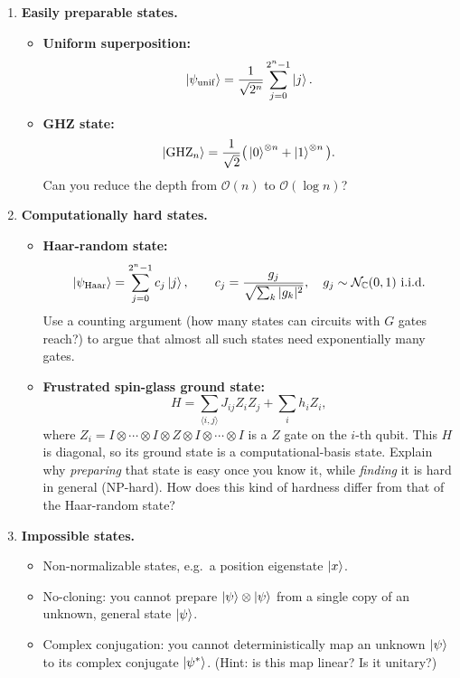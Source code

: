 \documentclass[11pt]{article}
\begin{document}
\begin{enumerate}[label=(\alph*)]
\item \textbf{Easily preparable states.}
\begin{itemize}
  \item \textbf{Uniform superposition:}
  \[
  \ket{\psi_{\mathrm{unif}}}=\frac{1}{\sqrt{2^n}}\sum_{j=0}^{2^n-1}\ket{j}.
  \]

  \item \textbf{GHZ state:}
  \[
  \ket{\mathrm{GHZ}_n}=\frac{1}{\sqrt{2}}\big(\ket{0}^{\otimes n}+\ket{1}^{\otimes n}\big).
  \]
  Can you reduce the depth from $\mathcal{O}(n)$ to $\mathcal{O}(\log n)$?
\end{itemize}

\item \textbf{Computationally hard states.}
\begin{itemize}
  \item \textbf{Haar-random state:}
  \[
  \ket{\psi_{\mathrm{Haar}}}=\sum_{j=0}^{2^n-1}c_j\ket{j}, \qquad c_j=\frac{g_j}{\sqrt{\sum_k |g_k|^2}},\quad g_j\sim\mathcal{N}_{\mathbb{C}}(0,1)\ \text{i.i.d.}
  \]
  Use a counting argument (how many states can circuits with $G$ gates reach?) to argue that almost all such states need exponentially many gates.

  \item \textbf{Frustrated spin-glass ground state:}
  \[
  H=\sum_{\langle i,j\rangle}J_{ij}Z_iZ_j+\sum_i h_iZ_i,
  \]
  where $Z_i = I \otimes \cdots \otimes I \otimes Z \otimes I \otimes \cdots \otimes I$ is a $Z$ gate on the $i$-th qubit.
  This $H$ is diagonal, so its ground state is a computational-basis state. Explain why \emph{preparing} that state is easy once you know it, while \emph{finding} it is hard in general (NP-hard). How does this kind of hardness differ from that of the Haar-random state?
\end{itemize}

\item \textbf{Impossible states.}
\begin{itemize}
  \item Non-normalizable states, e.g.\ a position eigenstate $\ket{x}$.
  \item No-cloning: you cannot prepare $\ket{\psi}\otimes\ket{\psi}$ from a single copy of an unknown, general state $\ket{\psi}$.
  \item Complex conjugation: you cannot deterministically map an unknown $\ket{\psi}$ to its complex conjugate $\ket{\psi^*}$. (Hint: is this map linear? Is it unitary?)
\end{itemize}
\end{enumerate}
\end{document}
